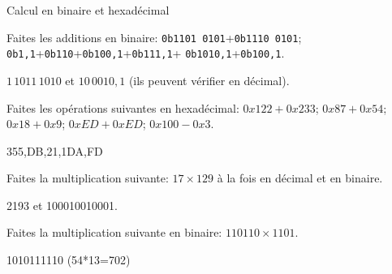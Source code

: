 \begin{exercice}
  \begin{exercicelet}{Calcul en binaire et hexadécimal}
    \begin{questions}
    \item Faites les additions en binaire:
      \texttt{0b1101\,0101}+\texttt{0b1110\,0101};
      \texttt{0b1,1}+\texttt{0b110}+\texttt{0b100,1}+\texttt{0b111,1}+%
      \texttt{0b1010,1}+\texttt{0b100,1}.
      \begin{xcorrection}$1\,1011\,1010$ et $10\,0010,1$ (ils peuvent
        vérifier en décimal).\end{xcorrection}
    \item Faites les opérations suivantes en hexadécimal: $0x122+0x233$;
      $0x87+0x54$; $0x18+0x9$; $0xED+0xED$; $0x100-0x3$.
      \begin{xcorrection}355,DB,21,1DA,FD\end{xcorrection}
    \item Faites la multiplication suivante: $17\times129$ à la fois en
      décimal et en binaire.
      \begin{xcorrection}2193 et 100010010001.\end{xcorrection}
    \item Faites la multiplication suivante en binaire: $110110\times 1101$.
      \begin{xcorrection}1010111110 (54*13=702)\end{xcorrection}
    \end{questions}
  \end{exercicelet}
\end{exercice}
